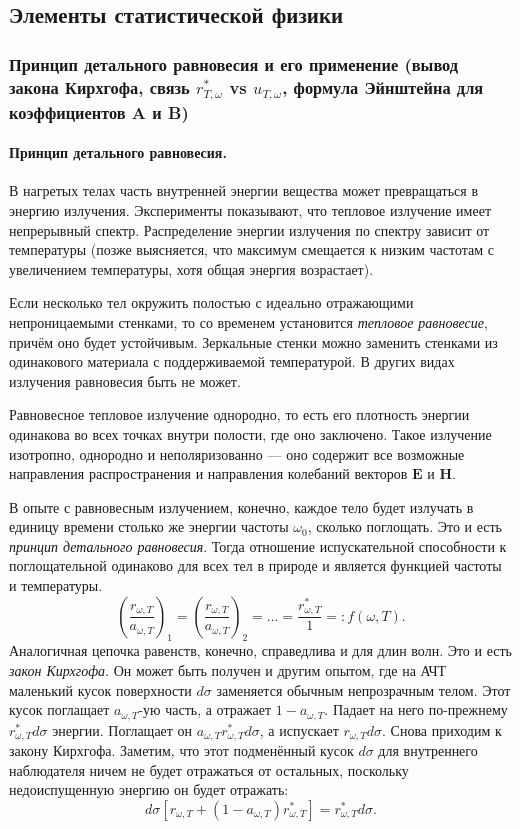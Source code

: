 \subsection{Элементы статистической физики}
\subsubsection{Принцип детального равновесия и его применение (вывод закона Кирхгофа, связь $r_{T, \omega}^*$ vs $u_{T, \omega}$, формула Эйнштейна для коэффициентов A и B)}
\paragraph{Принцип детального равновесия.}\label{sec:teplo} В нагретых телах часть внутренней
энергии вещества может превращаться в энергию излучения. Эксперименты
показывают, что тепловое излучение имеет непрерывный спектр. Распределение
энергии излучения по спектру зависит от температуры (позже выясняется, что
максимум смещается к низким частотам с увеличением температуры, хотя общая
энергия возрастает). 

Если несколько тел окружить полостью с идеально отражающими непроницаемыми
стенками, то со временем установится \emph{тепловое равновесие}, причём оно
будет устойчивым. Зеркальные стенки можно заменить стенками из одинакового
материала с поддерживаемой температурой. В других видах излучения равновесия
быть не может.

Равновесное тепловое излучение однородно, то есть его плотность
энергии одинакова во всех точках внутри полости, где оно 
заключено. Такое излучение изотропно, однородно и неполяризованно --- оно 
содержит все возможные направления распространения и 
направления колебаний векторов $ \mathbf E $ и $ \mathbf H $.

В опыте с равновесным излучением, конечно, каждое тело будет излучать в единицу
времени столько же энергии частоты $ \omega_0 $, сколько поглощать. Это и есть
\emph{принцип детального равновесия}. Тогда отношение испускательной способности
к поглощательной одинаково для всех тел в природе и является функцией частоты и
температуры. 
\[
  \left( \frac{r_{\omega, T}}{a_{\omega, T}} \right)_1 = \left( \frac{r_{\omega,
  T}}{a_{\omega, T}} \right)_2 = \ldots = \frac{r^\ast_{\omega, T}}{1} =:
  f(\omega, T).
\]
Аналогичная цепочка равенств, конечно, справедлива и для длин волн. Это и есть
\emph{закон Кирхгофа}. Он может быть получен и другим опытом, где на АЧТ
маленький кусок поверхности $ d\sigma $ заменяется обычным непрозрачным телом. Этот кусок
поглащает $ a_{\omega, T} $-ую часть, а отражает $ 1 - a_{\omega, T} $. Падает на него по-прежнему $
r^\ast_{\omega, T}d\sigma $ энергии. Поглащает он $ a_{\omega, T}
r^\ast_{\omega, T} d\sigma $, а испускает $ r_{\omega, T} d\sigma $. Снова
приходим к закону Кирхгофа. Заметим, что этот подменённый кусок $ d\sigma $ для
внутреннего наблюдателя ничем не будет отражаться от остальных, поскольку
недоиспущенную энергию он будет отражать: 
\[
  d\sigma [r_{\omega, T} + (1- a_{\omega, T}) r^\ast_{\omega, T}] =
  r^\ast_{\omega, T} d\sigma.
\]

